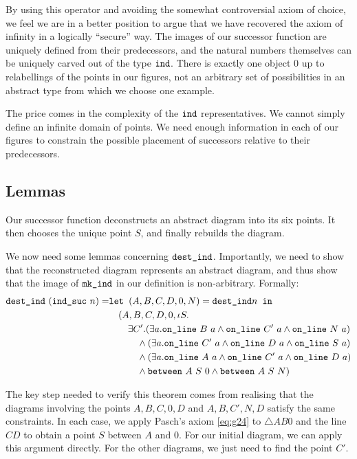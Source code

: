 By using this operator and avoiding the somewhat controversial axiom of choice, we feel we are in a better position to argue that we have recovered the axiom of infinity in a logically ``secure'' way. The images of our successor function are uniquely defined from their predecessors, and the natural numbers themselves can be uniquely carved out of the type $\texttt{ind}$. There is exactly one object $0$ up to relabellings of the points in our figures, not an arbitrary set of possibilities in an abstract type from which we choose one example.

The price comes in the complexity of the $\texttt{ind}$ representatives. We cannot simply define an infinite domain of points. We need enough information in each of our figures to constrain the possible placement of successors relative to their predecessors.

\subsection{Lemmas}
Our successor function deconstructs an abstract diagram into its six points. It then chooses the unique point $S$, and finally rebuilds the diagram. 

We now need some lemmas concerning $\texttt{dest\_ind}$. Importantly, we need to show that the reconstructed diagram represents an abstract diagram, and thus show that the image of $\texttt{mk\_ind}$ in our definition is non-arbitrary. Formally:
\begin{align*}
\texttt{dest\_ind}\ (\texttt{ind\_suc}\ n) = & \texttt{let } (A,B,C,D,0,N) = \texttt{dest\_ind} n \texttt{ in}\\
&\quad (A,B,C,D,0,\iota S.\\
&\quad\quad \exists C'. (\exists a. \texttt{on\_line}\ B\ a \wedge \texttt{on\_line}\ C'\ a \wedge \texttt{on\_line}\ N\ a)\\
&\qquad\quad \wedge (\exists a. \texttt{on\_line}\ C'\ a \wedge \texttt{on\_line}\ D\ a \wedge \texttt{on\_line}\ S\ a)\\
&\qquad\quad \wedge (\exists a. \texttt{on\_line}\ A\ a \wedge \texttt{on\_line}\ C'\ a \wedge \texttt{on\_line}\ D\ a)\\
&\qquad\quad \wedge \texttt{between}\ A\ S\ 0 \wedge \texttt{between}\ A\ S\ N)
\end{align*} 

The key step needed to verify this theorem comes from realising that the diagrams involving the points $A,B,C,0,D$ and $A,B,C',N,D$ satisfy the same constraints. In each case, we apply Pasch's axiom \eqref{eq:g24} to $\triangle AB0$ and the line $CD$ to obtain a point $S$ between $A$ and $0$. For our initial diagram, we can apply this argument directly. For the other diagrams, we just need to find the point $C'$.

